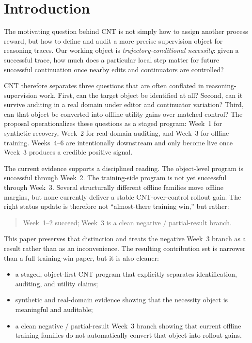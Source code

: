 \section{Introduction}

The motivating question behind CNT is not simply how to assign another process reward, but how to define and audit a more precise supervision object for reasoning traces. Our working object is \emph{trajectory-conditional necessity}: given a successful trace, how much does a particular local step matter for future successful continuation once nearby edits and continuators are controlled?

CNT therefore separates three questions that are often conflated in reasoning-supervision work. First, can the target object be identified at all? Second, can it survive auditing in a real domain under editor and continuator variation? Third, can that object be converted into offline utility gains over matched control? The proposal operationalizes these questions as a staged program: Week~1 for synthetic recovery, Week~2 for real-domain auditing, and Week~3 for offline training. Weeks~4--6 are intentionally downstream and only become live once Week~3 produces a credible positive signal.

The current evidence supports a disciplined reading. The object-level program is successful through Week~2. The training-side program is not yet successful through Week~3. Several structurally different offline families move offline margins, but none currently deliver a stable CNT-over-control rollout gain. The right status update is therefore not ``almost-there training win,'' but rather:

\begin{quote}
Week~1--2 succeed; Week~3 is a clean negative / partial-result branch.
\end{quote}

This paper preserves that distinction and treats the negative Week~3 branch as a result rather than as an inconvenience. The resulting contribution set is narrower than a full training-win paper, but it is also cleaner:

\begin{itemize}
  \item a staged, object-first CNT program that explicitly separates identification, auditing, and utility claims;
  \item synthetic and real-domain evidence showing that the necessity object is meaningful and auditable;
  \item a clean negative / partial-result Week~3 branch showing that current offline training families do not automatically convert that object into rollout gains.
\end{itemize}
